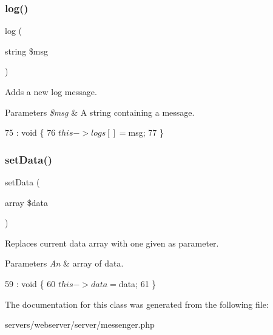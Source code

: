 \mbox{\label{class_lora_1_1_messenger_a0a48838f3bd7b73107241ac3ce7c5f02}} 
\subsubsection{log()}
{\footnotesize\ttfamily log (\begin{DoxyParamCaption}\item[{string}]{\$msg }\end{DoxyParamCaption})}

Adds a new log message. 
\begin{DoxyParams}{Parameters}
{\em \$msg} & A string containing a message. \\
\hline
\end{DoxyParams}

\begin{DoxyCode}
75                                       : \textcolor{keywordtype}{void} \{
76         $this->logs [] = $msg;
77     \}
\end{DoxyCode}
\mbox{\label{class_lora_1_1_messenger_a87449bdd364c33ff024d32896342bf31}} 
\subsubsection{set\+Data()}
{\footnotesize\ttfamily set\+Data (\begin{DoxyParamCaption}\item[{array}]{\$data }\end{DoxyParamCaption})}

Replaces current data array with one given as parameter. 
\begin{DoxyParams}{Parameters}
{\em An} & array of data. \\
\hline
\end{DoxyParams}

\begin{DoxyCode}
59                                           : \textcolor{keywordtype}{void} \{
60         $this->data = $data;
61     \}
\end{DoxyCode}


The documentation for this class was generated from the following file\+:\begin{DoxyCompactItemize}
\item 
servers/webserver/server/messenger.\+php\end{DoxyCompactItemize}
